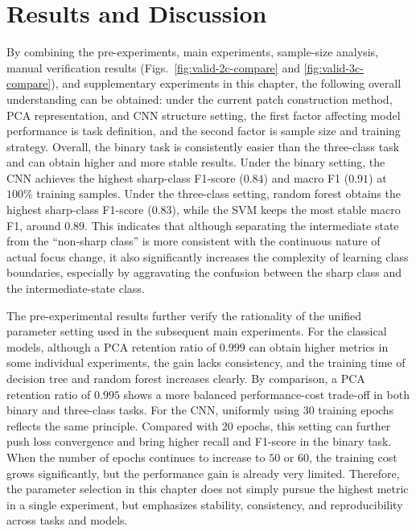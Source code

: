\section{Results and Discussion}
\par By combining the pre-experiments, main experiments, sample-size analysis,
manual verification results (Figs.~\ref{fig:valid-2c-compare} and
\ref{fig:valid-3c-compare}), and supplementary experiments in this chapter,
the following overall understanding can be obtained: under the current patch
construction method, PCA representation, and CNN structure setting, the first
factor affecting model performance is task definition, and the second factor is
sample size and training strategy. Overall, the binary task is consistently
easier than the three-class task and can obtain higher and more stable
results. Under the binary setting, the CNN achieves the highest sharp-class
F1-score ($0.84$) and macro F1 ($0.91$) at $100\%$ training samples. Under
the three-class setting, random forest obtains the highest sharp-class F1-score
($0.83$), while the SVM keeps the most stable macro F1, around $0.89$. This
indicates that although separating the intermediate state from the ``non-sharp
class'' is more consistent with the continuous nature of actual focus change,
it also significantly increases the complexity of learning class boundaries,
especially by aggravating the confusion between the sharp class and the
intermediate-state class.

\par The pre-experimental results further verify the rationality of the unified
parameter setting used in the subsequent main experiments. For the classical
models, although a PCA retention ratio of $0.999$ can obtain higher metrics in
some individual experiments, the gain lacks consistency, and the training time
of decision tree and random forest increases clearly. By comparison, a PCA
retention ratio of $0.995$ shows a more balanced performance-cost trade-off in
both binary and three-class tasks. For the CNN, uniformly using $30$ training
epochs reflects the same principle. Compared with $20$ epochs, this setting
can further push loss convergence and bring higher recall and F1-score in the
binary task. When the number of epochs continues to increase to $50$ or $60$,
the training cost grows significantly, but the performance gain is already very
limited. Therefore, the parameter selection in this chapter does not simply
pursue the highest metric in a single experiment, but emphasizes stability,
consistency, and reproducibility across tasks and models.

